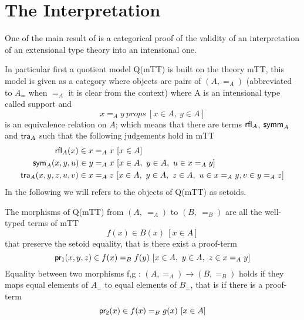 
\section{The Interpretation}
	One of the main result of \cite{maietti2009minimalist} is a categorical proof of the validity of an interpretation of an extensional type theory into an intensional one. 
	
	In particular first a quotient model Q(mTT) is built on the theory mTT, this model is given as a category where objects are pairs of $(A, =_A )$ (abbreviated to $A_=$ when $=_A$ it is clear from the context) where A is an intensional type called {support} and \[ x =_A y \ props\ [x\in A,\ y \in A]\] is an equivalence relation on $A$; which means that there are terms ${\text{\ensuremath{\mathsf{rfl}}}}_A$, ${\text{\ensuremath{\mathsf{symm}}}}_A$ and ${\text{\ensuremath{\mathsf{tra}}}}_A$ such that the following judgements hold in mTT
	\begin{align*}
	{\text{\ensuremath{\mathsf{rfl}}}}_A(x) \in x& =_A x\ [x\in A]\\
	{\text{\ensuremath{\mathsf{sym}}}}_A(x,y,u) \in y & =_A x\ [x\in A,\ y\in A,\ u \in x =_A y ]\\
	{\text{\ensuremath{\mathsf{tra}}}}_A(x,y,z,u,v) \in x & = _A z\ [x \in A,\ y \in A,\ z \in A,\ u \in x =_A y, v \in y =_A z ]
	\end{align*}
	In the following we will refers to the objects of Q(mTT) as setoids.
	
	The morphisms of Q(mTT) from $(A,\ =_A)$ to $(B,\ =_B)$  are all the well-typed terms of mTT \[ f(x) \in B(x) \ [x\in A]\] that preserve the setoid equality, that is there exist a proof-term \[{\text{\ensuremath{\mathsf{pr_1}}}}(x,y,z) \in f(x) =_B f(y)\ [x \in A,\ y \in A,\ z \in x =_A y ]\]
	Equality between two morphisms f,g : $(A,=_A ) \to (B,=_B )$ holds if they maps equal elements of $A_=$ to equal elements of $B_=$, that is if there is a proof-term \[{\text{\ensuremath{\mathsf{pr_2}}}}(x) \in f(x) =_B g(x)\ [x \in A]\]
	
